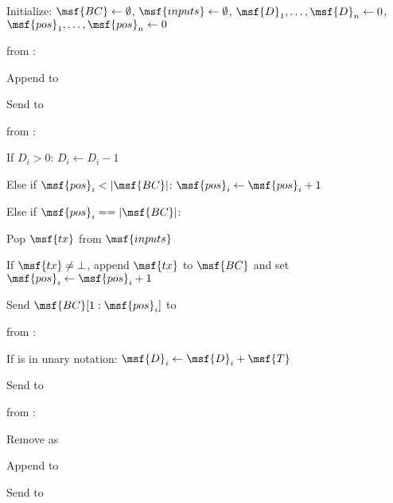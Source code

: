 \begin{bbox}[title={$\mathcal{F}_\msf{Atomic}$}]

Initialize: $\msf{BC} \leftarrow \emptyset$, $\msf{inputs} \leftarrow \emptyset$, $\msf{D}_1, \dots, \msf{D}_n \leftarrow 0$, 
$\msf{pos}_1 , \dots, \msf{pos}_n \leftarrow 0$

\OnInput {} from \Partyi:
    
    \quad Append  to 
    
    \quad Send  to \Adv
    
\OnInput {} from \Partyi:

    \quad If $D_i > 0$: $D_i \leftarrow D_i - 1$
    
    \quad Else if $\msf{pos}_i < |\msf{BC}|$: $\msf{pos}_i \leftarrow \msf{pos}_i + 1$
        
    \quad Else if $\msf{pos}_i == |\msf{BC}|$:
        
        \qquad Pop $\msf{tx}$ from $\msf{inputs}$
        
        \qquad If $\msf{tx} \neq \bot$, append $\msf{tx}$ to $\msf{BC}$ and set $\msf{pos}_i \leftarrow \msf{pos}_i + 1$
        
    \quad Send $\msf{BC}[1:\msf{pos}_i]$ to \Partyi
    
\OnInput {} from \Adv:

    \quad If  is in unary notation: $\msf{D}_i \leftarrow \msf{D}_i + \msf{T}$
    
    \quad Send  to \Adv

\OnInput {} from \Adv:

    \quad Remove  as 
    
    \quad Append  to 
    
    \quad Send  to \Adv

\end{bbox}
